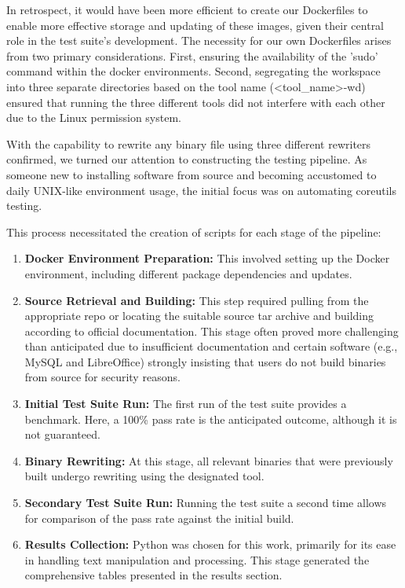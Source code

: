\documentclass[a4paper,11pt,oneside]{report}
\begin{document}
In retrospect, it would have been more efficient to create our Dockerfiles to enable
more effective storage and updating of these images, given their central role in the test
suite's development. The necessity for our own Dockerfiles arises from two primary
considerations. First, ensuring the availability of the 'sudo' command within the docker
environments. Second, segregating the workspace into three separate directories based on
the tool name (\textless{}tool\_name\textgreater{}-wd) ensured that running the three different tools did not
interfere with each other due to the Linux permission system.

With the capability to rewrite any binary file using three different rewriters
confirmed, we turned our attention to constructing the testing pipeline. As someone new to
installing software from source and becoming accustomed to daily UNIX-like environment
usage, the initial focus was on automating coreutils testing.

This process necessitated the creation of scripts for each stage of the pipeline:

\begin{enumerate}
    \item \textbf{Docker Environment Preparation:} This involved setting up the Docker environment, including different package dependencies and updates.
    
    \item \textbf{Source Retrieval and Building:} This step required pulling from the appropriate repo or locating the suitable source tar archive and 
    building according to official documentation. This stage often proved more challenging than anticipated due to insufficient documentation and 
    certain software (e.g., MySQL and LibreOffice) strongly insisting that users do not build binaries from source for security reasons.
    
    \item \textbf{Initial Test Suite Run:} The first run of the test suite provides a benchmark. Here, a 100\% pass rate is the anticipated outcome, 
    although it is not guaranteed.
    
    \item \textbf{Binary Rewriting:} At this stage, all relevant binaries that were previously built undergo rewriting using the designated tool.
    
    \item \textbf{Secondary Test Suite Run:} Running the test suite a second time allows for comparison of the pass rate against the initial build.
    
    \item \textbf{Results Collection:} Python was chosen for this work, primarily for its ease in handling text manipulation and processing. 
    This stage generated the comprehensive tables presented in the results section.
\end{enumerate}
\end{document}

